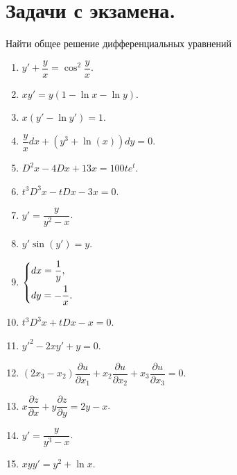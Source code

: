\documentclass[a4paper, 12pt]{report}
\date{}
\numberwithin{equation}{section}
\renewcommand{\d}{\partial}
\begin{document}
	\newpage
	\section*{Задачи с экзамена.}
	Найти общее решение дифференциальных уравнений
	\begin{enumerate}
		\item $y' + \dfrac y x = \cos^2\dfrac y x$.
		\item $xy'=y(1-\ln x-\ln y)$.
		\item $x(y'-\ln y')=1$.
		\item $\dfrac y xdx + (y^3 + \ln(x))dy =0.$
		\item $D^2x-4Dx+13x=100te^t$.
		\item $t^3D^3x-tDx-3x=0$.
		\item $y'=\dfrac{y}{y^2-x}$.
		\item $y'\sin(y')=y$.
		\item $\begin{dcases}
			dx = \dfrac 1 y,\\
			dy = - \dfrac 1 x.
		\end{dcases}$
		\item $t^3D^3x + tDx - x = 0$.
		\item $y'^2-2 x y' + y = 0$.
		\item $(2x_3 - x_2)\dfrac {\d u}{\d x_1} + x_2\dfrac{\d u}{\d x_2}+x_3\dfrac{\d u}{\d x_3} = 0.$
		\item $x \dfrac{\d z}{\d x} + y \dfrac{\d z}{\d y} = 2 y - x$.
		\item $y'=\dfrac{y}{y^3-x}$.
		\item $ x y y' = y^2 + \ln x$.
	\end{enumerate}
	
\end{document}
